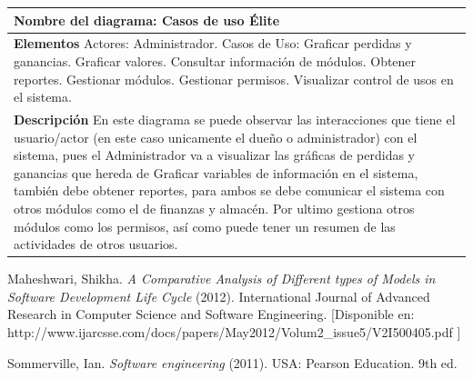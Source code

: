 \documentclass[spanish,12pt,letterpapper]{article}
\begin{document}
	\begin{tabular}{|p{10cm}|}
	\hline
	\textbf{Nombre del diagrama:} Casos de uso Élite\\
	\hline
	\textbf{Elementos} \linebreak
	Actores: Administrador. \linebreak
	Casos de Uso:
	Graficar perdidas y ganancias.
	Graficar valores.
	Consultar información de módulos.
	Obtener reportes.
	Gestionar módulos.
	Gestionar permisos.
	Visualizar control de usos en el sistema.\\
	\hline
	\textbf{Descripción}
	En este diagrama se puede observar las interacciones que tiene el usuario/actor (en este caso unicamente el dueño o administrador) con el sistema, pues el Administrador va a visualizar las gráficas de perdidas y ganancias que hereda de Graficar variables de información en el sistema, también debe obtener reportes, para ambos se debe comunicar el sistema con otros módulos como el de finanzas y almacén. Por ultimo gestiona otros módulos como los permisos, así como puede tener un resumen de las actividades de otros usuarios.  \\
	\hline
	\end{tabular}
	
	\pagebreak
	\begin{thebibliography}{9}
	  Maheshwari, Shikha. 
		\emph{A Comparative Analysis of Different types of Models in Software Development Life Cycle} (2012). International Journal of Advanced Research in Computer Science and Software Engineering. [Disponible en: http://www.ijarcsse.com/docs/papers/May2012/Volum2\_issue5/V2I500405.pdf ]
		
		  Sommerville, Ian. 
		\emph{Software engineering} (2011). USA:  Pearson Education. 9th ed. 
		
	\end{thebibliography}
	
\end{document}
